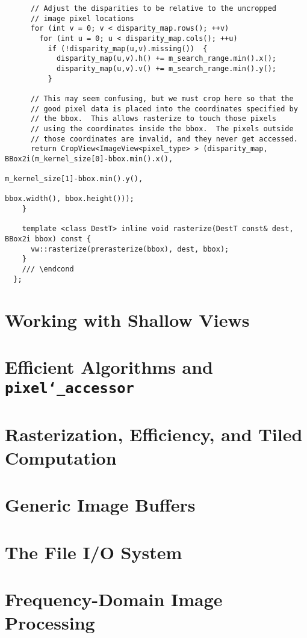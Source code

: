 \begin{verbatim}
      // Adjust the disparities to be relative to the uncropped
      // image pixel locations
      for (int v = 0; v < disparity_map.rows(); ++v)
        for (int u = 0; u < disparity_map.cols(); ++u)
          if (!disparity_map(u,v).missing())  {
            disparity_map(u,v).h() += m_search_range.min().x();
            disparity_map(u,v).v() += m_search_range.min().y();
          }

      // This may seem confusing, but we must crop here so that the
      // good pixel data is placed into the coordinates specified by
      // the bbox.  This allows rasterize to touch those pixels
      // using the coordinates inside the bbox.  The pixels outside
      // those coordinates are invalid, and they never get accessed.
      return CropView<ImageView<pixel_type> > (disparity_map, BBox2i(m_kernel_size[0]-bbox.min().x(), 
                                                                     m_kernel_size[1]-bbox.min().y(), 
                                                                     bbox.width(), bbox.height()));
    }
    
    template <class DestT> inline void rasterize(DestT const& dest, BBox2i bbox) const {
      vw::rasterize(prerasterize(bbox), dest, bbox);
    }
    /// \endcond
  };
\end {verbatim}


\section{Working with Shallow Views}\label{sec:advanced.shallow}

\section{Efficient Algorithms and {\tt pixel\char`\_accessor}}

\section{Rasterization, Efficiency, and Tiled Computation}

\section{Generic Image Buffers}\label{sec:advanced.generic}

\section{The File I/O System}\label{sec:advanced.fileio}

\section{Frequency-Domain Image Processing}\label{sec:advanced.frequency}
